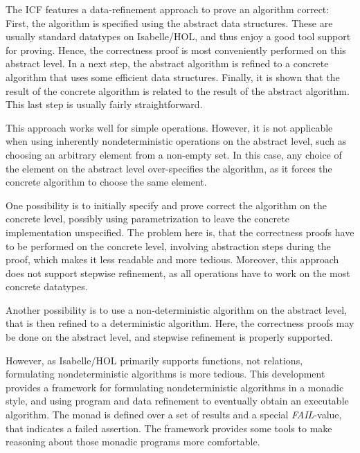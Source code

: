 \documentclass[11pt,a4paper]{book}
\begin{document}
The ICF features a data-refinement approach to prove an algorithm correct:
First, the algorithm is specified using the abstract data structures. These are
usually standard datatypes on Isabelle/HOL, and thus enjoy a good tool support
for proving. Hence, the correctness proof is most conveniently performed on this
abstract level. In a next step, the abstract algorithm is refined to a 
concrete algorithm that uses some efficient data structures. Finally, it is 
shown that the result of the concrete algorithm is related to the result of 
the abstract algorithm. This last step is usually fairly straightforward.

This approach works well for simple operations. However, it is not 
applicable when using inherently nondeterministic operations on the abstract level,
such as choosing an arbitrary element from a non-empty set. In this case, any 
choice of the element on the abstract level
over-specifies the algorithm, as it forces the concrete algorithm to choose the
same element.

One possibility is to initially specify and prove correct the algorithm on 
the concrete level, possibly using parametrization to leave the concrete
implementation unspecified. The problem here is, that the correctness proofs
have to be performed on the concrete level, involving abstraction steps during 
the proof, which makes it less readable and more tedious. Moreover, this 
approach does not support stepwise refinement, as all operations have to work on
the most concrete datatypes.

Another possibility is to use a non-deterministic algorithm on the abstract 
level, that is then refined to a deterministic algorithm. Here, the 
correctness proofs may be done on the abstract level, and stepwise refinement is
properly supported.

However, as Isabelle/HOL  primarily supports functions, not relations,
formulating   nondeterministic  algorithms   is  more   tedious.  This
development  provides  a  framework for  formulating  nondeterministic
algorithms in a  monadic style, and using program  and data refinement
to  eventually obtain an  executable algorithm.  The monad  is defined
over a set of results and a special {\em FAIL}-value, that indicates a
failed assertion.  The framework provides some tools to make reasoning
about those monadic programs more comfortable.
\end{document}
